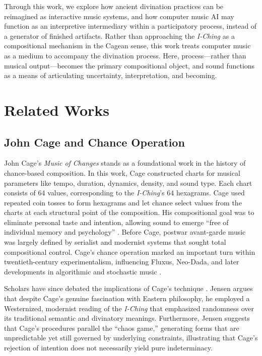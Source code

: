 \documentclass{article}
\begin{document}
Through this work, we explore how ancient divination practices can be reimagined as interactive music systems, and how computer music AI may function as an interpretive intermediary within a participatory process, instead of a generator of finished artifacts.
Rather than approaching the \textit{I-Ching} as a compositional mechanism in the Cagean sense, this work treats computer music as a medium to accompany the divination process. 
Here, process---rather than musical output---becomes the primary compositional object, and sound functions as a means of articulating uncertainty, interpretation, and becoming.


\section{Related Works}\label{sec:relatedWorks}
\subsection{John Cage and Chance Operation}\label{subsec:cage}
John Cage’s \textit{Music of Changes} \cite{CageMusicChanges} stands as a foundational work in the history of chance-based composition. 
In this work, Cage constructed charts for musical parameters like tempo, duration, dynamics, density, and sound type. 
Each chart consists of 64 values, corresponding to the \textit{I-Ching}'s 64 hexagrams. 
Cage used repeated coin tosses to form hexagrams and let chance select values from the charts at each structural point of the composition. 
His compositional goal was to eliminate personal taste and intention, allowing sound to emerge “free of individual memory and psychology” \cite{cage1961silence}. 
Before Cage, postwar avant-garde music was largely defined by serialist and modernist systems that sought total compositional control.
Cage's chance operation marked an important turn within twentieth-century experimentalism, influencing Fluxus, Neo-Dada, and later developments in algorithmic and stochastic music \cite{brecht1963anthology, sitsky2002music, joseph2016experimentations}.

Scholars have since debated the implications of Cage’s technique \cite{patterson1996appraising, jensen2009john, bernstein2010writings}.
Jensen \cite{jensen2009john} argues that despite Cage's genuine fascination with Eastern philosophy, he employed a Westernized, modernist reading of the \textit{I-Ching} that emphasized randomness over its traditional semantic and divinatory meanings.
Furthermore, Jensen suggests that Cage’s procedures parallel the ``chaos game,'' generating forms that are unpredictable yet still governed by underlying constraints, illustrating that Cage’s rejection of intention does not necessarily yield pure indeterminacy.
\end{document}

